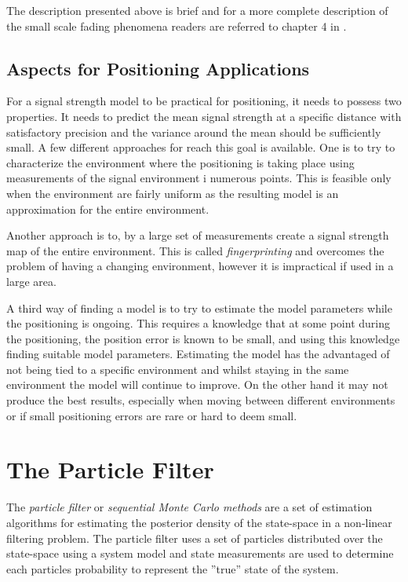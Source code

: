 \documentclass{LTHthesis}
\begin{document}
The description presented above is brief and for a more complete description of the small scale fading phenomena readers are referred to chapter 4 in \cite{rappaport96}.  
 \section{Aspects for Positioning Applications}
 \label{sec:AfPA}
 For a signal strength model to be practical for positioning, it needs to possess two properties. It needs to predict the mean signal strength at a specific distance with satisfactory precision and the variance around the mean should be sufficiently small. A few different approaches for reach this goal is available. One is to try to characterize the environment where the positioning is taking place using measurements of the signal environment i numerous points. This is feasible only when the environment are fairly uniform as the resulting model is an approximation for the entire environment. 
 
 Another approach is to, by a large set of measurements create a signal strength map of the entire environment. This is called \emph{fingerprinting} and overcomes the problem of having a changing environment, however it is impractical if used in a large area. 
 
 A third way of finding a model is to try to estimate the model parameters while the positioning is ongoing. This requires a knowledge that at some point during the positioning, the position error is known to be small, and using this knowledge finding suitable model parameters. Estimating the model has the advantaged of not being tied to a specific environment and whilst staying in the same environment the model will continue to improve. On the other hand it may not produce the best results, especially when moving between different environments or if small positioning errors are rare or hard to deem small.        
\chapter{The Particle Filter}
\label{chap:PF}
%
The \emph{particle filter} or \emph{sequential Monte Carlo methods} are a set of estimation algorithms for estimating the posterior density of the state-space in a non-linear filtering problem. The particle filter uses a set of particles distributed over the state-space using a system model and state measurements are used to determine each particles probability to represent the ''true'' state of the system.  
\end{document}
